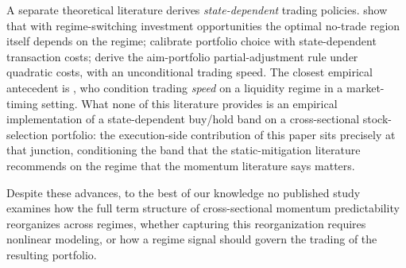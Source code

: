 A separate theoretical literature derives \emph{state-dependent} trading policies. \citet{Jang2007} show that with regime-switching investment opportunities the optimal no-trade region itself depends on the regime; \citet{LynchTan2011} calibrate portfolio choice with state-dependent transaction costs; \citet{GarleanuPedersen2013} derive the aim-portfolio partial-adjustment rule under quadratic costs, with an unconditional trading speed. The closest empirical antecedent is \citet{CollinDufresne2020}, who condition trading \emph{speed} on a liquidity regime in a market-timing setting. What none of this literature provides is an empirical implementation of a state-dependent buy/hold band on a cross-sectional stock-selection portfolio: the execution-side contribution of this paper sits precisely at that junction, conditioning the band that the static-mitigation literature recommends on the regime that the momentum literature says matters.

Despite these advances, to the best of our knowledge no published study examines how the full term structure of cross-sectional momentum predictability reorganizes across regimes, whether capturing this reorganization requires nonlinear modeling, or how a regime signal should govern the trading of the resulting portfolio.





